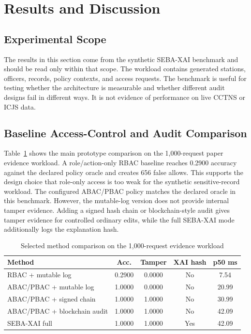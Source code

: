 \section{Results and Discussion}
\label{sec:results}

\subsection{Experimental Scope}

The results in this section come from the synthetic SEBA-XAI benchmark and
should be read only within that scope. The workload contains generated
stations, officers, records, policy contexts, and access requests. The
benchmark is useful for testing whether the architecture is measurable and
whether different audit designs fail in different ways. It is not evidence of
performance on live CCTNS or ICJS data.

\subsection{Baseline Access-Control and Audit Comparison}

Table~\ref{tab:method-comparison} shows the main prototype comparison on the
1,000-request paper evidence workload. A role/action-only RBAC baseline reaches
0.2900 accuracy against the declared policy oracle and creates 656 false
allows. This supports the design choice that role-only access is too weak for
the synthetic sensitive-record workload. The configured ABAC/PBAC policy
matches the declared oracle in this benchmark. However, the mutable-log version
does not provide internal tamper evidence. Adding a signed hash chain or
blockchain-style audit gives tamper evidence for controlled ordinary edits,
while the full SEBA-XAI mode additionally logs the explanation hash.

\begin{table}[t]
\centering
\caption{Selected method comparison on the 1,000-request evidence workload}
\label{tab:method-comparison}
\begin{tabular}{lcccc}
\toprule
Method & Acc. & Tamper & XAI hash & p50 ms \\
\midrule
RBAC + mutable log & 0.2900 & 0.0000 & No & 7.54 \\
ABAC/PBAC + mutable log & 1.0000 & 0.0000 & No & 20.99 \\
ABAC/PBAC + signed chain & 1.0000 & 1.0000 & No & 30.99 \\
ABAC/PBAC + blockchain audit & 1.0000 & 1.0000 & No & 42.09 \\
SEBA-XAI full & 1.0000 & 1.0000 & Yes & 42.09 \\
\bottomrule
\end{tabular}
\end{table}

